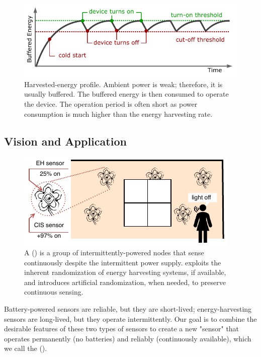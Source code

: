 \begin{figure}[b]
	\centering
		\includegraphics[width=\columnwidth]{figures/intermittent_operation}
		\caption{Harvested-energy profile. Ambient power is weak; therefore, it is usually buffered. The buffered energy is then consumed to operate the device. The operation period is often short as power consumption is much higher than the energy harvesting rate.}
		\label{fig:intermittent_opertaion}
\end{figure} 
%
\subsection{Vision and Application}
%
\begin{figure}[t]
	\centering
	\includegraphics[width=\columnwidth]{figures/smart_fabric}
	\caption{A \fullcis (\cis) is a group of intermittently-powered nodes that sense continuously despite the intermittent power supply. \cis exploits the inherent randomization of energy harvesting systems, if available, and introduces artificial randomization, when needed, to preserve continuous sensing.}
	\label{fig:smart_fabric}
\end{figure}
%
Battery-powered sensors are reliable, but they are short-lived; energy-harvesting sensors are long-lived, but they operate intermittently. Our goal is to combine the desirable features of these two types of sensors to 
create a new "sensor" that operates permanently (no batteries) and reliably (continuously available), which we call the \emph{\fullcis} (\cis).

